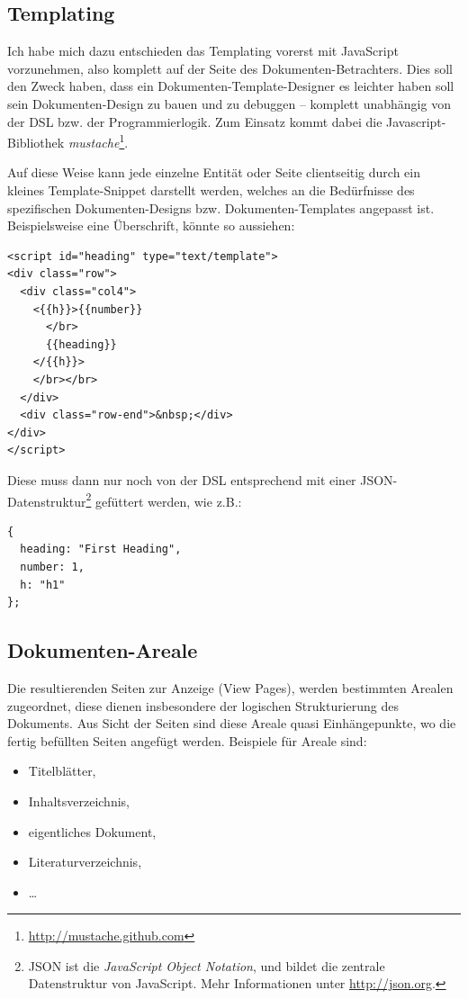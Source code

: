 \subsection{Templating}\label{sec-templating}

Ich habe mich dazu entschieden das Templating vorerst mit JavaScript
vorzunehmen, also komplett auf der Seite des Dokumenten-Betrachters.
Dies soll den Zweck haben, dass ein Dokumenten-Template-Designer es
leichter haben soll sein Dokumenten-Design zu bauen und zu debuggen --
komplett unabhängig von der DSL bzw. der Programmierlogik.
Zum Einsatz kommt dabei die Javascript-Bib\-lio\-thek
\emph{mustache}\footnote{\url{http://mustache.github.com}}.

Auf diese Weise kann jede einzelne Entität oder Seite clientseitig
durch ein kleines Template-Snippet darstellt werden, welches an die
Bedürfnisse des spezifischen Dokumenten-Designs bzw. Dokumenten-Templates
angepasst ist. Beispielsweise eine Überschrift, könnte so aussiehen:

\begin{verbatim}
<script id="heading" type="text/template">
<div class="row">
  <div class="col4">
    <{{h}}>{{number}}
      </br>
      {{heading}}
    </{{h}}>
    </br></br>
  </div>
  <div class="row-end">&nbsp;</div>
</div>
</script>
\end{verbatim}

Diese muss dann nur noch von der DSL entsprechend mit einer
JSON-Daten\-struktur\footnote{JSON ist die \emph{JavaScript Object Notation},
und bildet die zentrale Datenstruktur von JavaScript.
Mehr Informationen unter \url{http://json.org}.} gefüttert werden, wie z.B.:

\begin{verbatim}
{
  heading: "First Heading",
  number: 1,
  h: "h1"
};
\end{verbatim}

\subsection{Dokumenten-Areale}\label{sec-areal}

Die resultierenden Seiten zur Anzeige (View Pages), werden bestimmten
Arealen zugeordnet, diese dienen insbesondere der logischen Strukturierung
des Dokuments. Aus Sicht der Seiten sind diese Areale quasi
Einhängepunkte, wo die fertig befüllten Seiten angefügt werden.
Beispiele für Areale sind:

\begin{itemize}
  \item Titelblätter,
  \item Inhaltsverzeichnis,
  \item eigentliches Dokument,
  \item Literaturverzeichnis,
  \item \ldots
\end{itemize}

